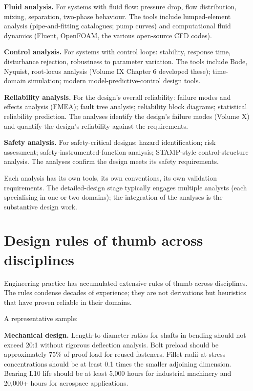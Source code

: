 \textbf{Fluid analysis.} For systems with fluid flow: pressure drop, flow distribution, mixing, separation, two-phase behaviour. The tools include lumped-element analysis (pipe-and-fitting catalogues; pump curves) and computational fluid dynamics (Fluent, OpenFOAM, the various open-source CFD codes).

\textbf{Control analysis.} For systems with control loops: stability, response time, disturbance rejection, robustness to parameter variation. The tools include Bode, Nyquist, root-locus analysis (Volume IX Chapter 6 developed these); time-domain simulation; modern model-predictive-control design tools.

\textbf{Reliability analysis.} For the design's overall reliability: failure modes and effects analysis (FMEA); fault tree analysis; reliability block diagrams; statistical reliability prediction. The analyses identify the design's failure modes (Volume X) and quantify the design's reliability against the requirements.

\textbf{Safety analysis.} For safety-critical designs: hazard identification; risk assessment; safety-instrumented-function analysis; STAMP-style control-structure analysis. The analyses confirm the design meets its safety requirements.

Each analysis has its own tools, its own conventions, its own validation requirements. The detailed-design stage typically engages multiple analysts (each specialising in one or two domains); the integration of the analyses is the substantive design work.

\section{Design rules of thumb across disciplines}

Engineering practice has accumulated extensive rules of thumb across disciplines. The rules condense decades of experience; they are not derivations but heuristics that have proven reliable in their domains.

A representative sample:

\textbf{Mechanical design.} Length-to-diameter ratios for shafts in bending should not exceed 20:1 without rigorous deflection analysis. Bolt preload should be approximately 75\% of proof load for reused fasteners. Fillet radii at stress concentrations should be at least 0.1 times the smaller adjoining dimension. Bearing L10 life should be at least 5,000 hours for industrial machinery and 20,000+ hours for aerospace applications.

